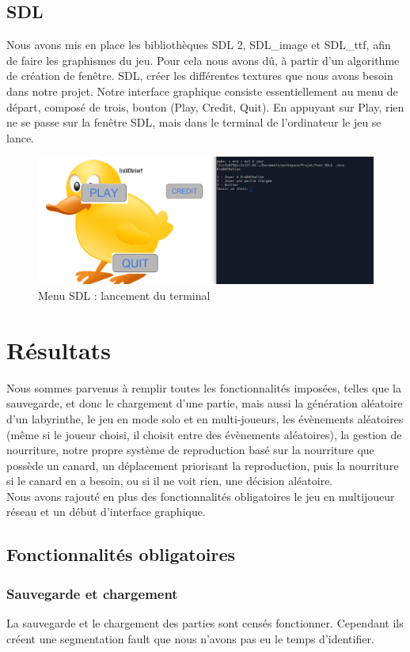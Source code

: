 \documentclass[12pt,a4paper,twoside]{article}
\begin{document}
\subsection{SDL}
Nous avons mis en place les bibliothèques SDL 2, SDL\_image et SDL\_ttf, afin de faire les 
graphismes du jeu. Pour cela nous avons dû, à partir d’un algorithme de création de fenêtre.
SDL, créer les différentes textures que nous avons besoin dans notre projet.
Notre interface graphique consiste essentiellement au menu de départ, composé de trois, bouton (Play, Credit, Quit).
En appuyant sur Play, rien ne se passe sur la fenêtre SDL, mais dans le terminal de l’ordinateur le jeu se lance.\\
\begin{figure}[h]
\centering
\includegraphics[width=1\textwidth]{jeu.png}
\caption{Menu SDL : lancement du terminal}
\end{figure}
\newpage
\section{Résultats}
    Nous sommes parvenus à remplir toutes les fonctionnalités imposées,
telles que la sauvegarde, et donc le chargement d’une partie, mais aussi la
génération aléatoire d'un labyrinthe, le jeu en mode solo et en multi-joueurs,
les évènements aléatoires (même si le joueur choisi, il choisit entre des
évènements aléatoires), la gestion de nourriture, notre propre système de
reproduction basé sur la nourriture que possède un canard, un déplacement priorisant
la reproduction, puis la nourriture si le canard en a besoin, ou si il ne voit rien,
une décision aléatoire.
\\Nous avons rajouté en plus des fonctionnalités obligatoires le jeu en multijoueur réseau et un début d’interface graphique. 
\subsection{Fonctionnalités obligatoires}
\subsubsection{Sauvegarde et chargement}
    La sauvegarde et le chargement des parties sont censés fonctionner. Cependant ils créent une segmentation fault que nous n’avons pas eu le temps d’identifier. 
\end{document}
